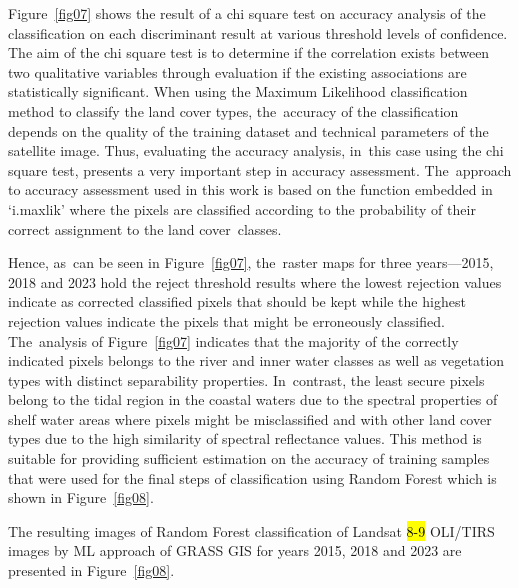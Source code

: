 \documentclass[coasts,article,accept,pdftex,oneauthor]{Definitions/mdpi}
\begin{document}
Figure~\ref{fig07} shows the result of a chi square test on accuracy analysis of the classification on each discriminant result at various threshold levels of confidence. {The aim of the  chi square test is to determine if the correlation exists between two qualitative variables through evaluation if the existing associations are statistically significant. }When using the Maximum Likelihood classification method to classify the land cover types, the~{accuracy of the classification} depends on the quality of the training dataset and technical parameters of the {satellite }image. Thus, evaluating the accuracy analysis, in~this case using the chi square test, {presents a} very important {step in accuracy assessment}. The~approach to accuracy assessment used in this work is based on the function embedded in `i.maxlik' where the pixels are classified according to the probability of their correct assignment to the land cover~classes. 



Hence, as~can be seen in Figure~\ref{fig07}, the~raster maps for three years---2015, 2018 and 2023 {hold} the reject threshold results where the lowest rejection values indicate as corrected classified pixels that should be kept while the highest rejection values indicate the pixels that might be erroneously classified. The~analysis of Figure~\ref{fig07} indicates that the {majority of the} correctly indicated pixels {belongs} to the river and inner water classes as well as vegetation types with distinct separability properties{. In~contrast,} the least secure pixels belong to the tidal region in the coastal waters due to the spectral properties of shelf water areas where pixels {might} be misclassified {and }with other land cover types {due to the high similarity of spectral reflectance values}. This method is suitable for providing sufficient estimation on the accuracy of training samples that were used for the final steps of {classification using Random Forest which is} shown in Figure~\ref{fig08}.  

The resulting images of Random Forest classification of Landsat \hl{8-9} OLI/TIRS images by ML approach of GRASS GIS for years 2015, 2018 and 2023 are presented in Figure~\ref{fig08}. 
\end{document}
